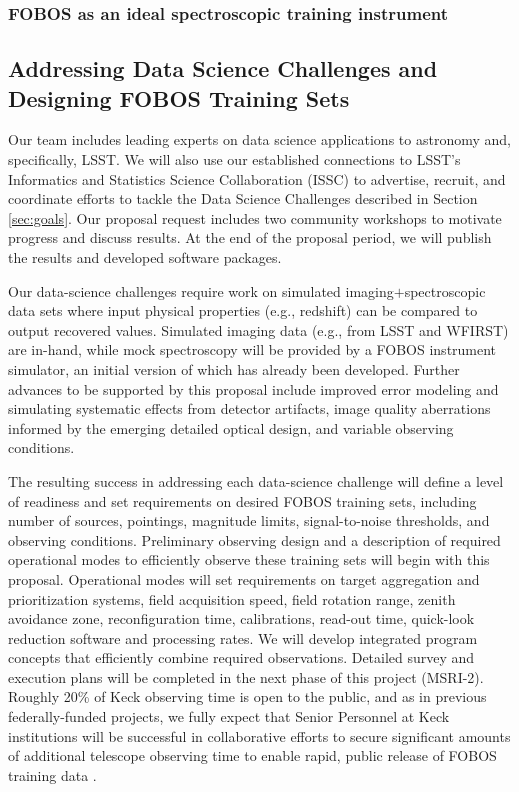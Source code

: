 
\subsubsection{FOBOS as an ideal spectroscopic training instrument}
\label{sec:datascience}

\subsection{Addressing Data Science Challenges and Designing FOBOS Training Sets}
\label{sec:survey}

Our team includes leading experts on data science applications to
astronomy and, specifically, LSST.  We will also use our established
connections to LSST's Informatics and Statistics Science Collaboration
(ISSC) to advertise, recruit, and coordinate efforts to tackle the Data
Science Challenges described in Section \ref{sec:goals}.  Our proposal
request includes two community workshops to motivate progress and discuss
results. At the end of the proposal period, we will publish the results
and developed software packages.

Our data-science challenges require work on simulated
imaging$+$spectroscopic data sets where input physical properties (e.g.,
redshift) can be compared to output recovered values.  Simulated imaging
data (e.g., from LSST and WFIRST) are in-hand, while mock spectroscopy
will be provided by a FOBOS instrument simulator, an initial version of
which has already been developed.  Further advances to be supported by
this proposal include improved error modeling and simulating systematic
effects from detector artifacts, image quality aberrations informed by
the emerging detailed optical design, and variable observing conditions.

The resulting success in addressing each data-science challenge will
define a level of readiness and set requirements on desired FOBOS
training sets, including number of sources, pointings, magnitude limits,
signal-to-noise thresholds, and observing conditions.  Preliminary
observing design and a description of required operational modes to
efficiently observe these training sets will begin with this proposal.
Operational modes will set requirements on target aggregation and
prioritization systems, field acquisition speed, field rotation range,
zenith avoidance zone, reconfiguration time, calibrations, read-out
time, quick-look reduction software and processing rates.  We will
develop integrated program concepts that efficiently combine required
observations.  Detailed survey and execution plans will be completed in
the next phase of this project (MSRI-2).  Roughly 20\% of Keck observing
time is open to the public, and as in previous federally-funded
projects, we fully expect that Senior Personnel at Keck institutions
will be successful in collaborative efforts to secure significant
amounts of additional telescope observing time to enable rapid, public
release of FOBOS training data \citep[e.g.,][]{newman13}.

